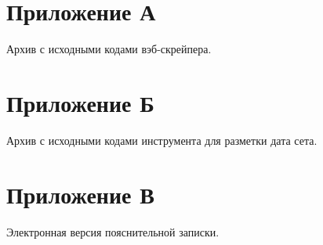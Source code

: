 \documentclass[../main]{subfiles}
\begin{document}
\newpage
{}
\label{sec:appendix1}
\section*{Приложение А}

Архив с исходными кодами вэб-скрейпера.


\newpage
{}
\label{sec:appendix2}
\section*{Приложение Б}

Архив с исходными кодами инструмента для разметки дата сета.



\newpage
{}
\label{sec:appendix3}
\section*{Приложение В}

Электронная версия пояснительной записки.
\end{document}
